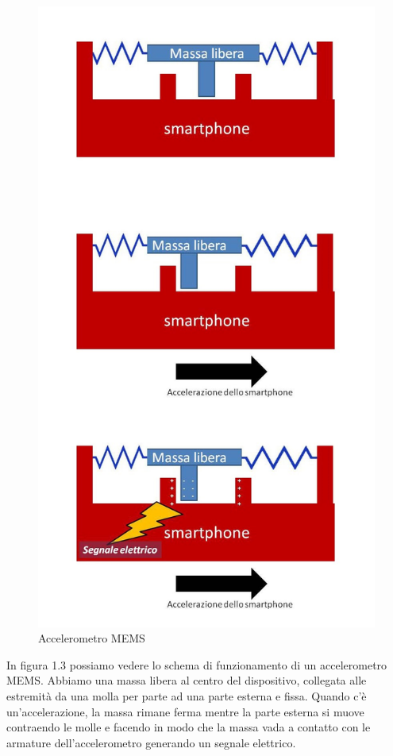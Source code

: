 \documentclass[12pt,a4paper,openright,twoside]{report}
\begin{document}
\begin{figure}[h!]
\centering 
\includegraphics[scale=0.2]{fig4} 
\caption{Accelerometro MEMS} 
\end{figure}
In figura 1.3 possiamo vedere lo schema di funzionamento di un accelerometro MEMS. Abbiamo una massa libera al centro del dispositivo, collegata alle estremità da una molla per parte ad una parte esterna e fissa. Quando c'è un'accelerazione, la massa rimane ferma mentre la parte esterna si muove contraendo le molle e facendo in modo che la massa vada a contatto con le armature dell'accelerometro generando un segnale elettrico. 
\end{document}
